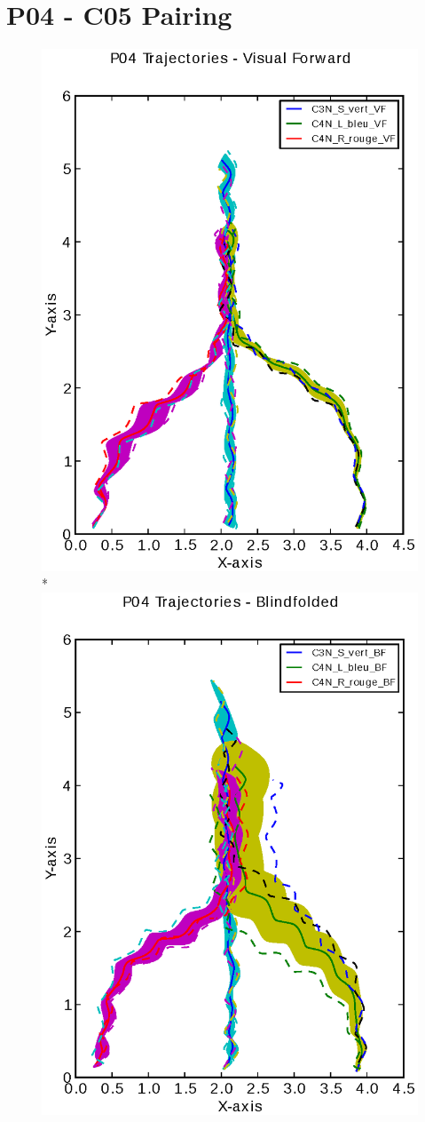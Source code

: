 \documentclass[a4page,landscape,twocolumn,10pt]{article}
\begin{document}
\section{P04 - C05 Pairing}
\begin{figure}[!htbp]
  \centering
  \includegraphics[width=0.4\linewidth]{P04_trajectory_VF.eps}
  \\*
  \includegraphics[width=0.4\linewidth]{P04_trajectory_BF.eps}
\end{figure}
\end{document}
